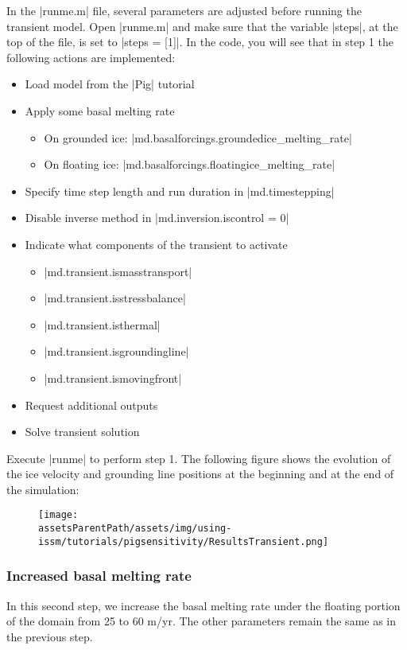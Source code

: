 In the \lstinlinebg|runme.m| file, several parameters are adjusted before running the transient model. Open \lstinlinebg|runme.m| and make sure that the variable \lstinlinebg|steps|, at the top of the file, is set to \lstinlinebg|steps = [1]|. In the code, you will see that in step 1 the following actions are implemented:
\begin{itemize}
	\item Load model from the \lstinlinebg|Pig| tutorial
	\item Apply some basal melting rate
		\begin{itemize}
			\item On grounded ice: \lstinlinebg|md.basalforcings.groundedice_melting_rate|
			\item On floating ice: \lstinlinebg|md.basalforcings.floatingice_melting_rate|
		\end{itemize}
	\item Specify time step length and run duration in \lstinlinebg|md.timestepping|
	\item Disable inverse method in \lstinlinebg|md.inversion.iscontrol = 0|
	\item Indicate what components of the transient to activate
		\begin{itemize}
			\item \lstinlinebg|md.transient.ismasstransport|
			\item \lstinlinebg|md.transient.isstressbalance|
			\item \lstinlinebg|md.transient.isthermal|
			\item \lstinlinebg|md.transient.isgroundingline|
			\item \lstinlinebg|md.transient.ismovingfront|
		\end{itemize}
	\item Request additional outputs
	\item Solve transient solution
\end{itemize}

Execute \lstinlinebg|runme| to perform step 1. The following figure shows the evolution of the ice velocity and grounding line positions at the beginning and at the end of the simulation:
\begin{figure}[H]
	\begin{center}
		\texttt{[image: \\assetsParentPath/assets/img/using-issm/tutorials/pigsensitivity/ResultsTransient.png]}
	\end{center}
\end{figure}
\subsubsection{Increased basal melting rate}%
In this second step, we increase the basal melting rate under the floating portion of the domain from 25 to 60 m/yr. The other parameters remain the same as in the previous step.

